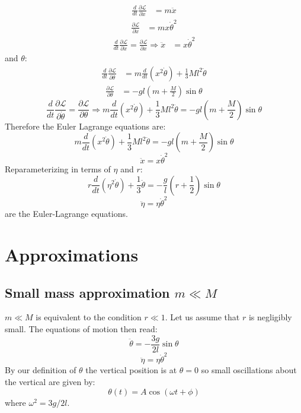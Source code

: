 \documentclass[9pt]{report}
\begin{document}
\begin{enumerate}
\[\begin{align}
\frac{d}{dt} \frac{\partial \mathcal{L}}{\partial\dot{x}} &= m \ddot{x}
\end{align}
\]
\[
\begin{align}
\frac{\partial \mathcal{L}}{\partial x} &= m x \dot{\theta}^2
\end{align}
\]
\[
\begin{align}
 \frac{d}{dt} \frac{\partial \mathcal{L}}{\partial\dot{x}} = \frac{\partial \mathcal{L}}{\partial x} \Rightarrow \ddot{x} &= x \dot{\theta}^2
\end{align}
\]
and $\theta$:
\[
\begin{align}
\frac{d}{dt} \frac{\partial \mathcal{L}}{\partial\dot{\theta}} &= m \frac{d}{dt}(x^2\dot{\theta}) + \frac{1}{3} Ml^2 \ddot{\theta}
\end{align}
\]
\[
\begin{align}
\frac{\partial \mathcal{L}}{\partial \theta} &= -gl (m + \frac{M}{2}) \sin \theta
\end{align}
\]
\[
\frac{d}{dt} \frac{\partial \mathcal{L}}{\partial\dot{\theta}} = \frac{\partial \mathcal{L}}{\partial \theta} \Rightarrow m \frac{d}{dt}(x^2\dot{\theta}) + \frac{1}{3} Ml^2 \ddot{\theta}
= -gl (m + \frac{M}{2}) \sin \theta
\]
Therefore the Euler Lagrange equations are:
\[
m \frac{d}{dt}(x^2\dot{\theta}) + \frac{1}{3} Ml^2 \ddot{\theta} = -gl (m + \frac{M}{2}) \sin \theta \label{el_theta}
\]
\[
\ddot{x} = x \dot{\theta}^2 \label{el_x}
\]
Reparameterizing in terms of $\eta$ and $r$:
\begin{equation}
r \frac{d}{dt}(\eta^2\dot{\theta}) + \frac{1}{3}\ddot{\theta} = -\frac{g}{l} (r + \frac{1}{2}) \sin \theta \label{el_eta}
\end{equation}
\begin{equation}
\ddot{\eta} = \eta \dot{\theta}^2 \label{el_theta}
\end{equation}
are the Euler-Lagrange equations.
\section{Approximations}
\subsection{Small mass approximation $m \ll M$}
$m \ll M$ is equivalent to the condition $r \ll 1$. Let us assume that $r$ is
negligibly small. The equations of motion then read:
\begin{equation}
\ddot{\theta} = -\frac{3g}{2l} \sin \theta \label{small_r_el_theta}
\end{equation}
\begin{equation}
\ddot{\eta} = \eta \dot{\theta}^2 \label{small_r_el_eta}
\end{equation}
By our definition of $\theta$ the vertical position is at $\theta = 0$ so small
oscillations about the vertical are given by:
\[
\theta(t) = A \cos (\omega t + \phi)
\]
where $\omega^2 = 3 g / 2 l$.


\end{enumerate}
\end{document}
